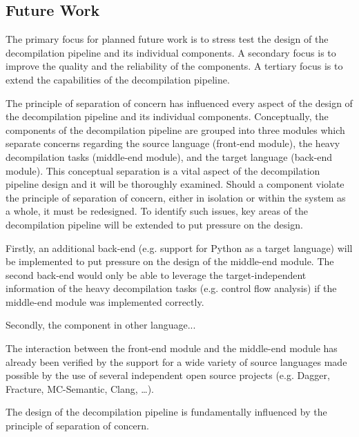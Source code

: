 
\subsection{Future Work}
\label{sec:future_work}


The primary focus for planned future work is to stress test the design of the decompilation pipeline and its individual components. A secondary focus is to improve the quality and the reliability of the components. A tertiary focus is to extend the capabilities of the decompilation pipeline.

The principle of separation of concern has influenced every aspect of the design of the decompilation pipeline and its individual components. Conceptually, the components of the decompilation pipeline are grouped into three modules which separate concerns regarding the source language (front-end module), the heavy decompilation tasks (middle-end module), and the target language (back-end module). This conceptual separation is a vital aspect of the decompilation pipeline design and it will be thoroughly examined. Should a component violate the principle of separation of concern, either in isolation or within the system as a whole, it must be redesigned. To identify such issues, key areas of the decompilation pipeline will be extended to put pressure on the design.


Firstly, an additional back-end (e.g. support for Python as a target language) will be implemented to put pressure on the design of the middle-end module. The second back-end would only be able to leverage the target-independent information of the heavy decompilation tasks (e.g. control flow analysis) if the middle-end module was implemented correctly.

Secondly, the component in other language...

The interaction between the front-end module and the middle-end module has already been verified by the support for a wide variety of source languages made possible by the use of several independent open source projects (e.g. Dagger, Fracture, MC-Semantic, Clang, …).

The design of the decompilation pipeline is fundamentally influenced by the principle of separation of concern.

